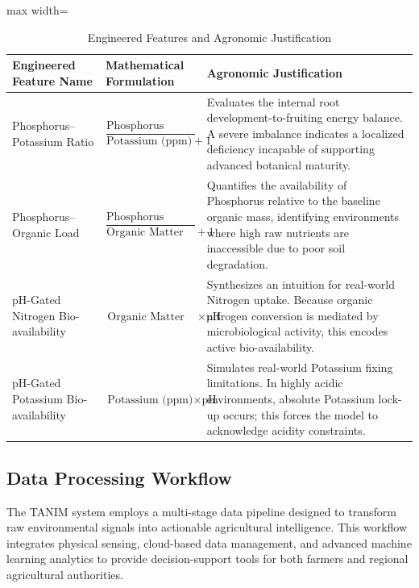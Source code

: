 {	\begin{table}[H]
		\centering
		\caption{Engineered Features and Agronomic Justification}
		\label{tab:engineered_features}
		\renewcommand{\arraystretch}{1.3}
		
		\begin{adjustbox}{max width=\textwidth}
			\begin{tabular}{p{4cm}p{4.5cm}p{7cm}}
				\toprule
				\textbf{Engineered Feature Name} & \textbf{Mathematical Formulation} & \textbf{Agronomic Justification} \\
				\midrule
				
				Phosphorus--Potassium Ratio 
				& $\dfrac{\text{Phosphorus (ppm)}}{\text{Potassium (ppm)} + 1}$ 
				& Evaluates the internal root development-to-fruiting energy balance. A severe imbalance indicates a localized deficiency incapable of supporting advanced botanical maturity. \\
				
				\midrule
				
				Phosphorus--Organic Load 
				& $\dfrac{\text{Phosphorus (ppm)}}{\text{Organic Matter (\%)} + 1}$ 
				& Quantifies the availability of Phosphorus relative to the baseline organic mass, identifying environments where high raw nutrients are inaccessible due to poor soil degradation. \\
				
				\midrule
				
				pH-Gated Nitrogen Bio-availability 
				& $\text{Organic Matter (\%)} \times \text{pH}$ 
				& Synthesizes an intuition for real-world Nitrogen uptake. Because organic nitrogen conversion is mediated by microbiological activity, this encodes active bio-availability. \\
				
				\midrule
				
				pH-Gated Potassium Bio-availability 
				& $\text{Potassium (ppm)} \times \text{pH}$ 
				& Simulates real-world Potassium fixing limitations. In highly acidic environments, absolute Potassium lock-up occurs; this forces the model to acknowledge acidity constraints. \\
				
				\bottomrule
			\end{tabular}
		\end{adjustbox}
	\end{table}
	
	\subsection{Data Processing Workflow}
	The TANIM system employs a multi-stage data pipeline designed to transform raw environmental signals into actionable agricultural intelligence. This workflow integrates physical sensing, cloud-based data management, and advanced machine learning analytics to provide decision-support tools for both farmers and regional agricultural authorities. 
	
}
